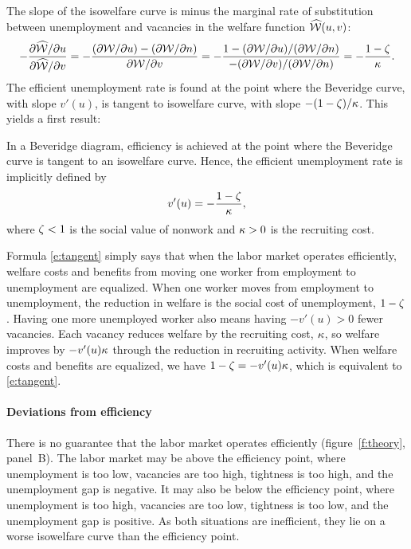 \documentclass[letterpaper,12pt,leqno]{article}
\def\W{\wh{\Wc}}
\begin{document}
The slope of the isowelfare curve is minus the marginal rate of substitution between unemployment and vacancies in the welfare function $\W(u,v)$:
\begin{equation*}
-\frac{\pdx{\W}{u}}{\pdx{\W}{v}} = -\frac{(\pdx{\Wc}{u})-(\pdx{\Wc}{n})}{\pdx{\Wc}{v}} = -\frac{1-(\pdx{\Wc}{u})/(\pdx{\Wc}{n})}{-(\pdx{\Wc}{v})/(\pdx{\Wc}{n})} = -\frac{1-\z}{\k}.
\end{equation*}
The efficient unemployment rate is found at the point where the Beveridge curve, with slope $v'(u)$, is tangent to isowelfare curve, with slope $-(1-\zeta)/\kappa$. This yields a first result:

\begin{proposition}\label{p:plan} In a Beveridge diagram, efficiency is achieved at the point where the Beveridge curve is tangent to an isowelfare curve. Hence, the efficient unemployment rate is implicitly defined by 
\begin{equation}
v'(u)  = - \frac{1-\zeta}{\kappa},
\label{e:tangent}\end{equation}
where $\zeta<1$ is the social value of nonwork and $\kappa>0$ is the recruiting cost.\end{proposition}

Formula \eqref{e:tangent} simply says that when the labor market operates efficiently, welfare costs and benefits from moving one worker from employment to unemployment are equalized. When one worker moves from employment to unemployment, the reduction in welfare is the social cost of unemployment, $1-\zeta$. Having one more unemployed worker also means having $-v'(u)>0$ fewer vacancies. Each vacancy reduces welfare by the recruiting cost, $\kappa$, so welfare improves by $-v'(u) \kappa$ through the reduction in recruiting activity. When welfare costs and benefits are equalized, we have $1-\zeta = - v'(u) \kappa$, which is equivalent to \eqref{e:tangent}.

\paragraph{Deviations from efficiency} There is no guarantee that the labor market operates efficiently (figure~\ref{f:theory}, panel~B). The labor market may be above the efficiency point, where unemployment is too low, vacancies are too high, tightness is too high, and the unemployment gap is negative. It may also be below the efficiency point, where unemployment is too high, vacancies are too low, tightness is too low, and the unemployment gap is positive. As both situations are inefficient, they lie on a worse isowelfare curve than the efficiency point.
\end{document}
